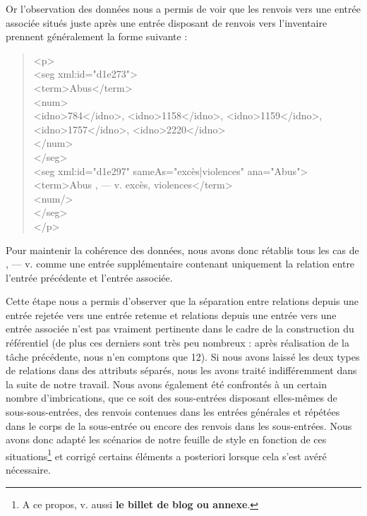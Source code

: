 \documentclass[a4paper,12pt,twoside]{book}
\begin{document}
	\noindent Or l'observation des données nous a permis de voir que les renvois vers une entrée associée situés juste après une entrée disposant de renvois vers l'inventaire prennent généralement la forme suivante :
	
	\pagebreak
	
	\begin{quotation}
            <p>\\
			\indent\indent<seg xml:id="d1e273">\\
			\indent\indent\indent<term>Abus</term>\\
			\indent\indent\indent<num>\\
			\indent\indent\indent\indent<idno>784</idno>, <idno>1158</idno>, <idno>1159</idno>,\\ 
			\indent\indent\indent\indent<idno>1757</idno>, <idno>2220</idno>\\
			\indent\indent\indent</num>\\
			\indent\indent</seg>\\
			\indent\indent<seg xml:id="d1e297" sameAs="excès|violences" ana="Abus">\\
			\indent\indent\indent<term>Abus , — v. excès, violences</term>\\
			\indent\indent\indent<num/>\\
			\indent\indent</seg>\\
			\indent</p>
	\end{quotation}
	
	\noindent Pour maintenir la cohérence des données, nous avons donc rétablis tous les cas de \og{} , — v. \fg{} comme une entrée supplémentaire contenant uniquement la relation entre l'entrée précédente et l'entrée associée. 
	
	Cette étape nous a permis d'observer que la séparation entre relations depuis une entrée rejetée vers une entrée retenue et relations depuis une entrée vers une entrée associée n'est pas vraiment pertinente dans le cadre de la construction du référentiel (de plus ces derniers sont très peu nombreux : après réalisation de la tâche précédente, nous n'en comptons que 12). Si nous avons laissé les deux types de relations dans des attributs séparés, nous les avons traité indifféremment dans la suite de notre travail. Nous avons également été confrontés à un certain nombre d'imbrications, que ce soit des sous-entrées disposant elles-mêmes de sous-sous-entrées, des renvois contenues dans les entrées générales et répétées dans le corps de la sous-entrée ou encore des renvois dans les sous-entrées. Nous avons donc adapté les scénarios de notre feuille de style en fonction de ces situations\footnote{A ce propos, v. aussi \textbf{le billet de blog ou annexe}.} et corrigé certains éléments a posteriori lorsque cela s'est avéré nécessaire.
	
\end{document}
